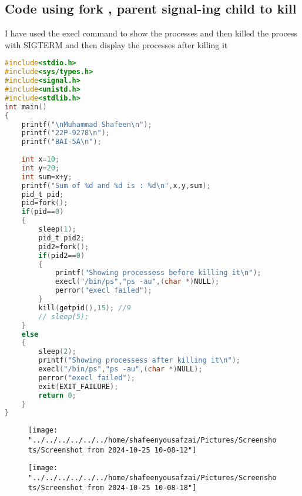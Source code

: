 \documentclass[12pt]{article}
\begin{document}
	
\subsection{Code using fork , parent signal-ing child to kill}
I have used the execl command to show the processes 
and then killed the process with SIGTERM and then display the processes after killing it
\begin{lstlisting}[language=C, caption={Mini-Shell using execvp}]
#include<stdio.h>
#include<sys/types.h>
#include<signal.h>
#include<unistd.h>
#include<stdlib.h>
int main()
{
	printf("\nMuhammad Shafeen\n");
	printf("22P-9278\n");
	printf("BAI-5A\n");
	
	int x=10;
	int y=20;
	int sum=x+y;
	printf("Sum of %d and %d is : %d\n",x,y,sum);
	pid_t pid;
	pid=fork();
	if(pid==0)
	{
		sleep(1);
		pid_t pid2;
		pid2=fork();
		if(pid2==0)
		{
			printf("Showing processess before killing it\n");
			execl("/bin/ps","ps -au",(char *)NULL);
			perror("execl failed");
		}
		kill(getpid(),15); //9
		// sleep(5);
	}
	else
	{
		sleep(2);
		printf("Showing processess after killing it\n");
		execl("/bin/ps","ps -au",(char *)NULL);
		perror("execl failed");
		exit(EXIT_FAILURE);
		return 0;
	}
}	

\end{lstlisting}
\begin{figure}[H]
	\centering
	\texttt{[image: "../../../../../../home/shafeenyousafzai/Pictures/Screenshots/Screenshot from 2024-10-25 10-08-12"]}
	\caption{}
	\label{fig:screenshot-from-2024-10-25-10-08-12}
\end{figure}
\begin{figure}[H]
	\centering
	\texttt{[image: "../../../../../../home/shafeenyousafzai/Pictures/Screenshots/Screenshot from 2024-10-25 10-08-18"]}
	\caption{}
	\label{fig:screenshot-from-2024-10-25-10-08-18}
\end{figure}
\end{document}
